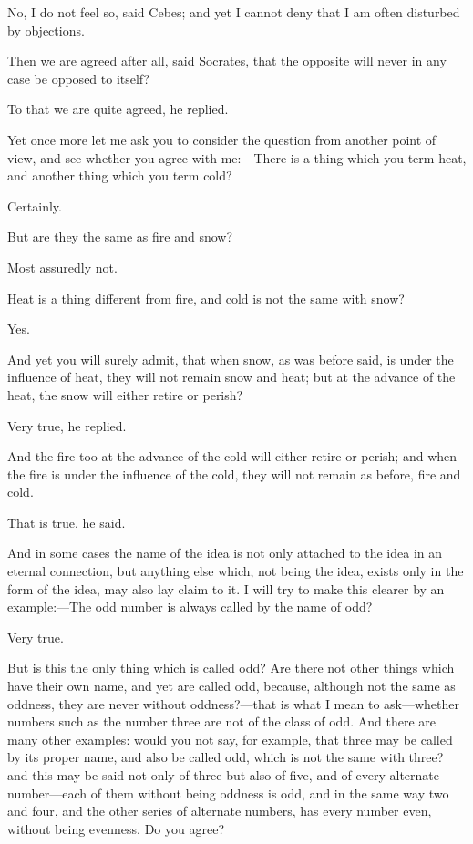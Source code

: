 No, I do not feel so, said Cebes; and yet I cannot deny that I am often
disturbed by objections.

Then we are agreed after all, said Socrates, that the opposite will never
in any case be opposed to itself?

To that we are quite agreed, he replied.

Yet once more let me ask you to consider the question from another point
of view, and see whether you agree with me:—There is a thing which
you term heat, and another thing which you term cold?

Certainly.

But are they the same as fire and snow?

Most assuredly not.

Heat is a thing different from fire, and cold is not the same with snow?

Yes.

And yet you will surely admit, that when snow, as was before said, is
under the influence of heat, they will not remain snow and heat; but at
the advance of the heat, the snow will either retire or perish?

Very true, he replied.

And the fire too at the advance of the cold will either retire or perish;
and when the fire is under the influence of the cold, they will not remain
as before, fire and cold.

That is true, he said.

And in some cases the name of the idea is not only attached to the idea in
an eternal connection, but anything else which, not being the idea, exists
only in the form of the idea, may also lay claim to it. I will try to make
this clearer by an example:—The odd number is always called by the
name of odd?

Very true.

But is this the only thing which is called odd? Are there not other things
which have their own name, and yet are called odd, because, although not
the same as oddness, they are never without oddness?—that is what I
mean to ask—whether numbers such as the number three are not of the
class of odd. And there are many other examples: would you not say, for
example, that three may be called by its proper name, and also be called
odd, which is not the same with three? and this may be said not only of
three but also of five, and of every alternate number—each of them
without being oddness is odd, and in the same way two and four, and the
other series of alternate numbers, has every number even, without being
evenness. Do you agree?

